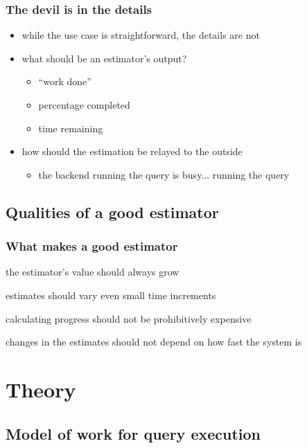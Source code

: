 \documentclass{beamer}
\begin{document}
\begin{frame}
  \frametitle{The devil is in the details}

  \begin{itemize}
  \item while the use case is straightforward, the details are not
  \item what should be an estimator's output?
    \begin{itemize}
    \item ``work done''
    \item percentage completed
    \item time remaining
    \end{itemize}
  \item how should the estimation be relayed to the outside
    \begin{itemize}
    \item the backend running the query is busy... running the query
    \end{itemize}
  \end{itemize}
\end{frame}

\subsection{Qualities of a good estimator}

\begin{frame}
  \frametitle{What makes a good estimator}

  \begin{description}
  \item[monotonicity] the estimator's value should always grow
  \item[granularity] estimates should vary even small time increments
  \item[low overhead] calculating progress should not be prohibitively
    expensive
  \item[hardware independence] changes in the estimates should not depend on
    how fast the system is
  \end{description}
\end{frame}

\section{Theory}
\subsection{Model of work for query execution}
\end{document}
